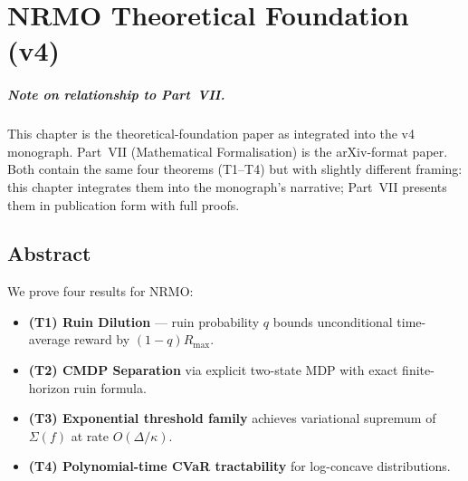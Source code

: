 
\chapter{NRMO Theoretical Foundation (v4)}
\label{ch:theoretical-foundation-v4}



\paragraph{Note on relationship to Part~VII.}
This chapter is the theoretical-foundation paper as integrated into
the v4 monograph. Part~VII (Mathematical Formalisation) is the
arXiv-format paper. Both contain the same four theorems (T1--T4)
but with slightly different framing: this chapter integrates them
into the monograph's narrative; Part~VII presents them in
publication form with full proofs.

\section{Abstract}
\label{sec:tf-v4-abstract}

We prove four results for NRMO:

\begin{itemize}
\item \textbf{(T1) Ruin Dilution} --- ruin probability $q$ bounds
unconditional time-average reward by $(1 - q) R_{\max}$.
\item \textbf{(T2) CMDP Separation} via explicit two-state MDP with
exact finite-horizon ruin formula.
\item \textbf{(T3) Exponential threshold family} achieves variational
supremum of $\Sigma(f)$ at rate $O(\Delta / \kappa)$.
\item \textbf{(T4) Polynomial-time CVaR tractability} for log-concave
distributions.
\end{itemize}

